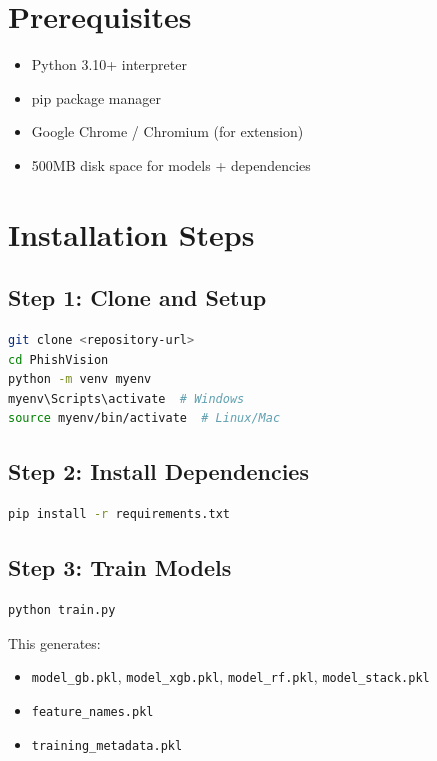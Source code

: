 \documentclass[12pt,a4paper]{report}
\begin{document}
\section{Prerequisites}

\begin{itemize}[leftmargin=*]
    \item Python 3.10+ interpreter
    \item pip package manager
    \item Google Chrome / Chromium (for extension)
    \item 500MB disk space for models + dependencies
\end{itemize}

\section{Installation Steps}

\subsection{Step 1: Clone and Setup}
\begin{lstlisting}[language=bash]
git clone <repository-url>
cd PhishVision
python -m venv myenv
myenv\Scripts\activate  # Windows
source myenv/bin/activate  # Linux/Mac
\end{lstlisting}

\subsection{Step 2: Install Dependencies}
\begin{lstlisting}[language=bash]
pip install -r requirements.txt
\end{lstlisting}

\subsection{Step 3: Train Models}
\begin{lstlisting}[language=bash]
python train.py
\end{lstlisting}

This generates:
\begin{itemize}[leftmargin=*]
    \item \texttt{model\_gb.pkl}, \texttt{model\_xgb.pkl}, \texttt{model\_rf.pkl}, \texttt{model\_stack.pkl}
    \item \texttt{feature\_names.pkl}
    \item \texttt{training\_metadata.pkl}
\end{itemize}
\end{document}
